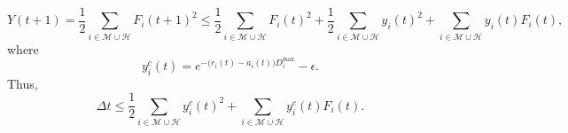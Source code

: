 \documentclass[journal,draftclsnofoot,onecolumn,12pt]{IEEEtran}%
\begin{document}
{\begin{equation}
Y(t+1)=\frac{1}{2}\sum_{i\in \mathcal{M} \cup \mathcal{H}} F_i(t+1)^2 \leq \frac{1}{2}\sum_{i\in \mathcal{M} \cup \mathcal{H}}F_i(t)^2+\frac{1}{2}\sum_{i\in \mathcal{M} \cup \mathcal{H}}y_i(t)^2+\sum_{i\in \mathcal{M} \cup \mathcal{H}}y_i(t)F_i(t),
\end{equation}}
where {\begin{equation}\label{eq:definition yt}
y^c_i(t)=e^{-\big(r_i(t)-a_i(t)\big)D_i^{\max}}-\epsilon.
\end{equation}}
Thus,
{\begin{equation} \label{eq:lyapunov opt ineq}
\Delta t \leq \frac{1}{2}\sum_{i\in \mathcal{M} \cup \mathcal{H}}y^c_i(t)^2+\sum_{i\in \mathcal{M} \cup \mathcal{H}}y^c_i(t)F_i(t).
\end{equation}}
\end{document}
